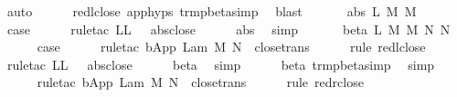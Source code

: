 \begin{isabellebody}
\ auto{\isacharbrackleft}{}{\isacharbrackright}\isanewline
\ \ \ \ \isamarkupfalse%
\ red{\isacharunderscore}l{\isacharunderscore}close\ app{\isachardot}hyps{\isacharparenleft}{}{\isacharcomma}{}{\isacharparenright}\ trm{\isacharunderscore}pbeta{\isacharunderscore}simp{}\ \isamarkupfalse%
\ blast\isanewline
\ \ \isamarkupfalse%
\isanewline
\ \ \isamarkupfalse%
\ {\isacharparenleft}abs\ L\ M\ M{\isacharprime}{\isacharparenright}\isanewline
\ \ \ \ \isamarkupfalse%
\ {\isacharquery}case\isanewline
\ \ \ \ \isamarkupfalse%
\ {\isacharparenleft}rule{\isacharunderscore}tac\ L{\isacharequal}L\ \ \ abs{\isacharunderscore}close{\isacharparenright}\isanewline
\ \ \ \ \isamarkupfalse%
\ abs\ \isamarkupfalse%
\ simp{\isacharplus}\isanewline
\ \ \isamarkupfalse%
\isanewline
\ \ \isamarkupfalse%
\ {\isacharparenleft}beta\ L\ M\ M{\isacharprime}\ N\ N{\isacharprime}{\isacharparenright}\isanewline
\ \ \ \ \isamarkupfalse%
\ {\isacharquery}case\isanewline
\ \ \ \ \isamarkupfalse%
\ {\isacharparenleft}rule{\isacharunderscore}tac\ b{\isacharequal}{\isachardoublequoteopen}App\ {\isacharparenleft}Lam\ M{\isacharprime}{\isacharparenright}\ N{\isachardoublequoteclose}\ \ close{\isachardot}trans{\isacharparenright}\isanewline
\ \ \ \ \isamarkupfalse%
\ {\isacharparenleft}rule\ red{\isacharunderscore}l{\isacharunderscore}close{\isacharparenright}\isanewline
\ \ \ \ \isamarkupfalse%
\ {\isacharparenleft}rule{\isacharunderscore}tac\ L{\isacharequal}L\ \ \ abs{\isacharunderscore}close{\isacharparenright}\isanewline
\ \ \ \ \isamarkupfalse%
\ beta\ \isamarkupfalse%
\ simp\isanewline
\ \ \ \ \isamarkupfalse%
\ beta\ trm{\isacharunderscore}pbeta{\isacharunderscore}simp{}\ \isamarkupfalse%
\ simp{\isacharplus}\isanewline
\ \ \ \ \isamarkupfalse%
\ {\isacharparenleft}rule{\isacharunderscore}tac\ b{\isacharequal}{\isachardoublequoteopen}App\ {\isacharparenleft}Lam\ M{\isacharprime}{\isacharparenright}\ N{\isacharprime}{\isachardoublequoteclose}\ \ close{\isachardot}trans{\isacharparenright}\isanewline
\ \ \ \ \isamarkupfalse%
\ {\isacharparenleft}rule\ red{\isacharunderscore}r{\isacharunderscore}close{\isacharparenright}\isanewline

\end{isabellebody}
